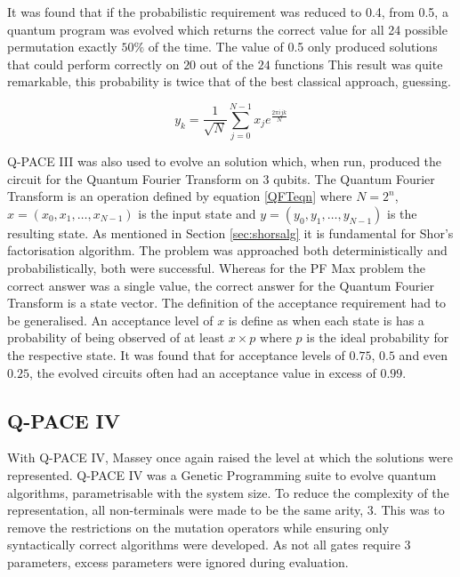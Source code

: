It was found that if the probabilistic requirement was reduced to 0.4, from 0.5, a quantum program was evolved which returns the correct value for all 24 possible permutation exactly $50\%$ of the time.
The value of 0.5 only produced solutions that could perform correctly on $20$ out of the $24$ functions 
This result was quite remarkable, this probability is twice that of the best classical approach, guessing.



\begin{equation}
 y_k = \frac{1}{\sqrt{N}} \sum_{j=0}^{N-1}{x_j}e^{\frac{2\pi{ijk}}{N}}
\label{QFTeqn}
\end{equation}

Q-PACE III was also used to evolve an solution which, when run, produced the circuit for the Quantum Fourier Transform on 3 qubits.
The Quantum Fourier Transform is an operation defined by equation \ref{QFTeqn} where $N = 2^n$, $x=(x_0, x_1, \ldots, x_{N-1})$ is the input state and $y=(y_0, y_1, \ldots, y_{N-1})$ is the resulting state.
As mentioned in Section \ref{sec:shorsalg} it is fundamental for Shor's factorisation algorithm.
The problem was approached both deterministically and probabilistically, both were successful.
Whereas for the PF Max problem the correct answer was a single value, the correct answer for the Quantum Fourier Transform is a state vector.
The definition of the acceptance requirement had to be generalised.
An acceptance level of $x$ is define as when each state is has a probability of being observed of at least $x\times{p}$ where $p$ is the ideal probability for the respective state.
It was found that for acceptance levels of $0.75$, $0.5$ and even $0.25$, the evolved circuits often had an acceptance value in excess of $0.99$.

\subsection{Q-PACE IV}
With Q-PACE IV, Massey once again raised the level at which the solutions were represented.
Q-PACE IV was a Genetic Programming suite to evolve quantum algorithms, parametrisable with the system size.
To reduce the complexity of the representation, all non-terminals were made to be the same arity, 3.
This was to remove the restrictions on the mutation operators while ensuring only syntactically correct algorithms were developed.
As not all gates require 3 parameters, excess parameters were ignored during evaluation.

